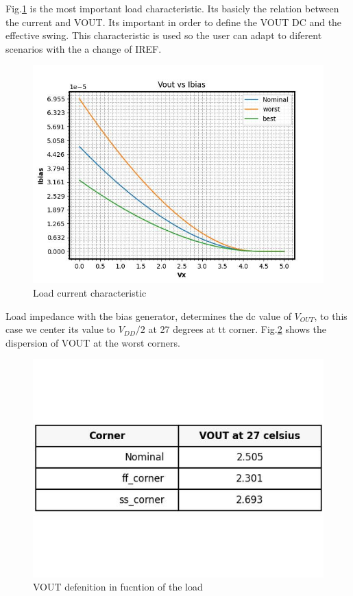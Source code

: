 \documentclass{article}
\begin{document}
Fig.\ref{fig:load_characteristic} is the most important load characteristic. Its basicly the relation between the current and VOUT. Its important in order to define the VOUT DC and the effective swing.
\newline
This characteristic is used so the user can adapt to diferent scenarios with the a change of IREF.


\begin{figure}[H] %
    \centering
    \includegraphics[width=.6\textwidth]{./only_PMOS_LOAD_current_characteristic.jpg} %
    \caption{Load current characteristic}\label{fig:load_characteristic}
\end{figure}











Load impedance with the bias generator, determines the dc value of $V_{OUT}$, to this case we center its value to $V_{DD}/2$ at 27 degrees at tt corner. Fig.\ref{fig:table_vout} shows the dispersion of VOUT at the worst corners.
\begin{figure}[H] %
    \centering
    \includegraphics[width=.6\textwidth]{./only_PMOS_LOAD_VDC_NMOS_table.jpg} %
    \caption{VOUT defenition in fucntion of the load}\label{fig:table_vout}
\end{figure}
\end{document}

